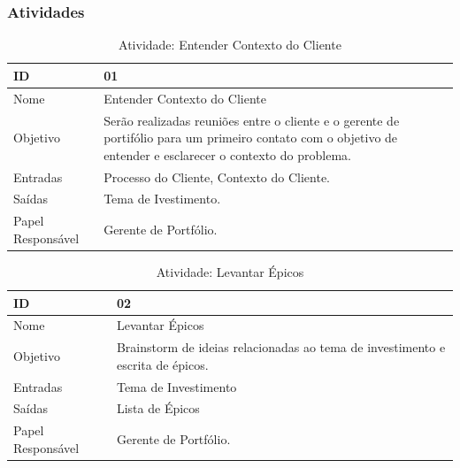 \subsubsection{Atividades}

  \begin{table}[H]
    \centering
      \begin{tabular}{| m{5em} | m{10cm} |}
        \hline
        ID       & 01   \\ \hline
        Nome     & Entender Contexto do Cliente   \\ \hline
        Objetivo & Serão realizadas reuniões entre o cliente e o gerente de portifólio para um primeiro contato com o objetivo de entender e esclarecer o contexto do problema. \\ \hline
        Entradas & Processo do Cliente, Contexto do Cliente.   \\ \hline
        Saídas   & Tema de Ivestimento. \\ \hline
        Papel Responsável   & Gerente de Portfólio. \\ \hline
      \end{tabular}
      \caption{Atividade: Entender Contexto do Cliente }
      \label{tabela:atividade1}
  \end{table}

  \begin{table}[H]
    \centering
      \begin{tabular}{| m{5em} | m{10cm} |}
        \hline
        ID       & 02   \\ \hline
        Nome     & Levantar Épicos   \\ \hline
        Objetivo & Brainstorm de ideias relacionadas ao tema de investimento e escrita de épicos. \\ \hline
        Entradas & Tema de Investimento   \\ \hline
        Saídas   & Lista de Épicos \\ \hline
        Papel Responsável   & Gerente de Portfólio. \\ \hline
      \end{tabular}
      \caption{Atividade: Levantar Épicos}
      \label{tabela:atividade2}
  \end{table}

